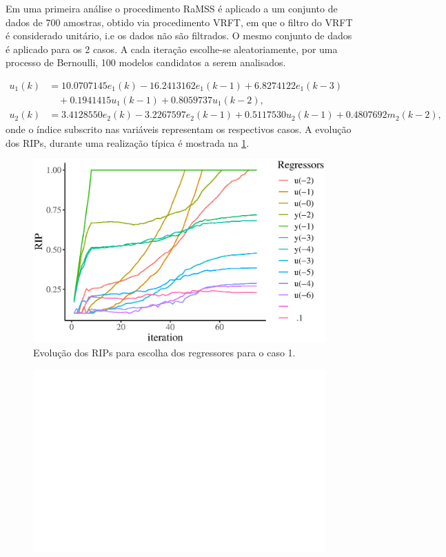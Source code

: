 \begin{exmp}
Em uma primeira análise o procedimento RaMSS é aplicado a um conjunto de dados de 700 amostras, obtido via procedimento VRFT, em que o filtro do VRFT é considerado unitário, i.e os dados não são filtrados. O mesmo conjunto de dados é aplicado para os 2 casos. A cada iteração escolhe-se aleatoriamente, por uma processo de Bernoulli, 100 modelos candidatos a serem analisados. 

\begin{align*}
  u_1(k) &= 10.0707145 e_1(k) - 16.2413162 e_1(k-1) + 6.8274122 e_1(k-3) \\ &\quad + 0.1941415 u_1(k-1) +  0.8059737 u_1(k-2), \\
  u_2(k) &= 3.4128550 e_2(k) - 3.2267597e_2(k-1) + 0.5117530 u_2(k-1) +  0.4807692m_2(k-2),
\end{align*}
onde o índice subscrito nas variáveis representam os respectivos casos.
A evolução dos RIPs, durante uma realização típica é mostrada na \ref{fig:exp51_ripevol1}.
\begin{figure}[H]
  \centering
  \includegraphics{Figs/sis2aord_l_ramss_RIPs.eps}
  \caption{Evolução dos RIPs para escolha dos regressores para o caso 1.}
  \label{fig:exp51_ripevol1}
\end{figure}
\begin{figure}[H]
  \centering
  \includegraphics{Figs/sis2aord_nl_ramss_RIPs.eps}

\end{figure}
\end{exmp}
